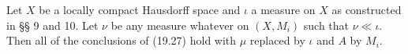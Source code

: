 Let $X$ be a locally compact Hausdorff space and $\iota$ a measure on $X$ as constructed in §§ 9 and 10. Let $\nu$ be any measure whatever on $(X, M_i)$ such that $\nu \ll \iota$. Then all of the conclusions of (19.27) hold with $\mu$ replaced by $\iota$ and $A$ by $M_i$.